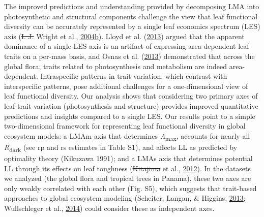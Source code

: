 \documentclass[12pt,]{article}
\theoremstyle{definition}
\theoremstyle{definition}
\theoremstyle{definition}
\theoremstyle{remark}
\providecommand{\DIFaddtex}[1]{{\protect\color{blue}\uwave{#1}}} %
\providecommand{\DIFdeltex}[1]{{\protect\color{red}\sout{#1}}}                      %
\providecommand{\DIFaddbegin}{} %
\providecommand{\DIFaddend}{} %
\providecommand{\DIFdelbegin}{} %
\providecommand{\DIFdelend}{} %
\providecommand{\DIFadd}[1]{\texorpdfstring{\DIFaddtex{#1}}{#1}} %
\providecommand{\DIFdel}[1]{\texorpdfstring{\DIFdeltex{#1}}{}} %
\newcommand{\DIFscaledelfig}{0.5}
\newlength{\DIFdelgraphicswidth} %
\newlength{\DIFdelgraphicsheight} %
\newcommand{\DIFaddincludegraphics}[2][]{{\color{blue}\fbox{\DIFOincludegraphics[#1]{#2}}}} %
\newcommand{\DIFdelincludegraphics}[2][]{%
\sbox{\DIFdelgraphicsbox}{\DIFOincludegraphics[#1]{#2}}%
\settoboxwidth{\DIFdelgraphicswidth}{\DIFdelgraphicsbox} %
\settoboxtotalheight{\DIFdelgraphicsheight}{\DIFdelgraphicsbox} %
\scalebox{\DIFscaledelfig}{%
\parbox[b]{\DIFdelgraphicswidth}{\usebox{\DIFdelgraphicsbox}\\[-\baselineskip] \rule{\DIFdelgraphicswidth}{0em}}\llap{\resizebox{\DIFdelgraphicswidth}{\DIFdelgraphicsheight}{%
\setlength{\unitlength}{\DIFdelgraphicswidth}%
\begin{picture}(1,1)%
\thicklines\linethickness{2pt} %
{\color[rgb]{1,0,0}\put(0,0){\framebox(1,1){}}}%
{\color[rgb]{1,0,0}\put(0,0){\line( 1,1){1}}}%
{\color[rgb]{1,0,0}\put(0,1){\line(1,-1){1}}}%
\end{picture}%
}\hspace*{3pt}}} %
} %
\DeclareRobustCommand{\DIFaddbegin}{\DIFOaddbegin \let\includegraphics\DIFaddincludegraphics} %
\DeclareRobustCommand{\DIFaddend}{\DIFOaddend \let\includegraphics\DIFOincludegraphics} %
\DeclareRobustCommand{\DIFdelbegin}{\DIFOdelbegin \let\includegraphics\DIFdelincludegraphics} %
\DeclareRobustCommand{\DIFdelend}{\DIFOaddend \let\includegraphics\DIFOincludegraphics} %
\begin{document}
\begin{itemize}
\DIFdelend The improved predictions and understanding provided by decomposing LMA
into photosynthetic and structural components challenge the view that
leaf functional diversity can be accurately represented by a single leaf
economics spectrum (LES) axis (\DIFdelbegin \DIFdel{I. J. }\DIFdelend Wright et al.,
\protect\DIFdelbegin %
\DIFdelend \DIFaddbegin \hyperlink{ref-Wright2004}{2004}\protect\hyperlink{ref-Wright2004}{b}\DIFaddend ).
Lloyd et al. (\protect\hyperlink{ref-Lloyd2013}{2013}) argued that the
apparent dominance of a single LES axis is an artifact of expressing
area-dependent leaf traits on a per-mass basis, and Osnas et al.
(\protect\hyperlink{ref-Osnas2013}{2013}) demonstrated that across the
global flora, traits related to photosynthesis and metabolism are indeed
area-dependent. Intraspecific patterns in trait variation, which
contrast with interspecific patterns, pose additional challenges for a
one-dimensional view of leaf functional diversity. Our analysis shows
that considering two primary axes of leaf trait variation
(photosynthesis and structure) provides improved quantitative
predictions and insights compared to a single LES. Our results point to
a simple two-dimensional framework for representing leaf functional
diversity in global ecosystem models: a LMAm axis that determines
\emph{A}\textsubscript{max}, accounts for nearly all
\emph{R}\textsubscript{dark} (see rp and rs estimates in Table S1), and
affects LL as predicted by optimality theory (Kikuzawa 1991); and a LMAs
axis that determines potential LL through its effects on leaf toughness
(\DIFdelbegin \DIFdel{Kitajima }\DIFdelend \DIFaddbegin \DIFadd{Kleyer }\DIFaddend et al., \protect\DIFdelbegin %
\DIFdelend \DIFaddbegin \hyperlink{ref-Kleyer2012}{2012}\DIFaddend ). In the
datasets we analyzed (the global flora and tropical trees in Panama),
these two axes are only weakly correlated with each other (Fig. S5),
which suggests that trait-based approaches to global ecosystem modeling
(Scheiter, Langan, \& Higgins,
\protect\hyperlink{ref-Scheiter2013}{2013}; Wullschleger et al.,
\protect\hyperlink{ref-Wullschleger2014}{2014}) could consider these as
independent axes.


\end{itemize}
\end{document}
